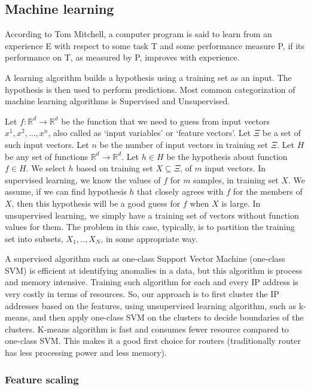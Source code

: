 \documentclass[12pt,oneside,a4paper]{article}
\begin{document}
\subsection{Machine learning}

According to Tom Mitchell\cite{machine-learning-def}, a computer program is said to learn from an experience E with respect to some task T and some performance measure P, if its performance on T, as measured by P, improves with experience.

A learning algorithm builds a hypothesis using a training set as an input. The hypothesis is then used to perform predictions. Most common categorization of machine learning algorithms is Supervised and Unsupervised.

Let $f: \mathbb{R}^d \rightarrow \mathbb{R}^d$ be the function that we need to guess from input vectors $x^{1}, x^{2}, ..., x^{n}$, also called as `input variables' or `feature vectors'. Let $\Xi$ be a set of such input vectors. Let $n$ be the number of input vectors in training set $\Xi$. Let $H$ be any set of functions $\mathbb{R}^d \rightarrow \mathbb{R}^d$. Let $h \in H$ be the hypothesis about function $f \in H$. We select $h$ based on training set $X \subseteq \Xi$, of $m$ input vectors. In supervised learning, we know the values of $f$ for $m$ samples, in training set $X$. We assume, if we can find hypothesis $h$ that closely agrees with $f$ for the members of $X$, then this hypothesis will be a good guess for $f$ when $X$ is large. In unsupervised learning, we simply have a training set of vectors without function values for them. The problem in this case, typically, is to partition the training set into subsets, $X_1,.. ,X_{N}$, in some appropriate way.\cite{machine-learning}

A supervised algorithm such as one-class Support Vector Machine (one-class SVM)\cite{svm} is efficient at identifying anomalies in a data, but this algorithm is process and memory intensive. Training such algorithm for each and every IP address is very costly in terms of resources. So, our approach is to first cluster the IP addresses based on the features, using unsupervised learning algorithm, such as k-means, and then apply one-class SVM on the clusters to decide boundaries of the clusters. K-means algorithm is fast and consumes fewer resource compared to one-class SVM. This makes it a good first choice for routers (traditionally router has less processing power and less memory).

\subsubsection{Feature scaling}
\end{document}
